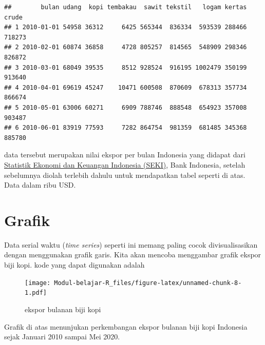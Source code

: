 \documentclass[
]{book}
\newenvironment{Shaded}{\begin{snugshade}}{\end{snugshade}}
\newcommand{\DataTypeTok}[1]{\textcolor[rgb]{0.13,0.29,0.53}{#1}}
\newcommand{\KeywordTok}[1]{\textcolor[rgb]{0.13,0.29,0.53}{\textbf{#1}}}
\newcommand{\NormalTok}[1]{#1}
\newcommand{\OperatorTok}[1]{\textcolor[rgb]{0.81,0.36,0.00}{\textbf{#1}}}
\newcommand{\StringTok}[1]{\textcolor[rgb]{0.31,0.60,0.02}{#1}}
\begin{document}
\begin{verbatim}
##        bulan udang  kopi tembakau  sawit tekstil   logam kertas  crude
## 1 2010-01-01 54958 36312     6425 565344  836334  593539 288466 718273
## 2 2010-02-01 60874 36858     4728 805257  814565  548909 298346 826872
## 3 2010-03-01 68049 39535     8512 928524  916195 1002479 350199 913640
## 4 2010-04-01 69619 45247    10471 600508  870609  678313 357734 866674
## 5 2010-05-01 63006 60271     6909 788746  888548  654923 357008 903487
## 6 2010-06-01 83919 77593     7282 864754  981359  681485 345368 885780
\end{verbatim}

data tersebut merupakan nilai ekspor per bulan Indonesia yang didapat dari \href{https://www.bi.go.id/id/statistik/seki/terkini/eksternal/Contents/Default.aspx}{Statistik Ekonomi dan Keuangan Indonesia (SEKI)}, Bank Indonesia, setelah sebelumnya diolah terlebih dahulu untuk mendapatkan tabel seperti di atas. Data dalam ribu USD.

\hypertarget{grafik}{%
\section{Grafik}\label{grafik}}

Data serial waktu (\emph{time series}) seperti ini memang paling cocok divisualisasikan dengan menggunakan grafik garis. Kita akan mencoba menggambar grafik ekspor biji kopi. kode yang dapat digunakan adalah

\begin{Shaded}
\end{Shaded}

\begin{figure}
\centering
\texttt{[image: Modul-belajar-R\_files/figure-latex/unnamed-chunk-8-1.pdf]}
\caption{\label{fig:unnamed-chunk-8}ekspor bulanan biji kopi}
\end{figure}

Grafik di atas menunjukan perkembangan ekspor bulanan biji kopi Indonesia sejak Januari 2010 sampai Mei 2020.
\end{document}
